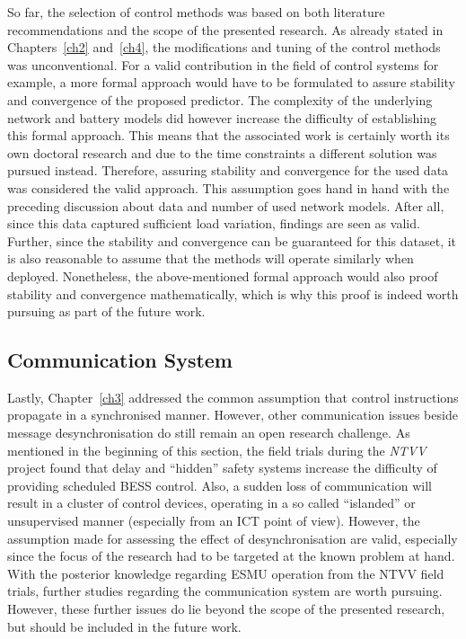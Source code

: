 So far, the selection of control methods was based on both literature recommendations and the scope of the presented research.
As already stated in Chapters~\ref{ch2} and~\ref{ch4}, the modifications and tuning of the control methods was unconventional.
For a valid contribution in the field of control systems for example, a more formal approach would have to be formulated to assure stability and convergence of the proposed predictor.
The complexity of the underlying network and battery models did however increase the difficulty of establishing this formal approach.
This means that the associated work is certainly worth its own doctoral research and due to the time constraints a different solution was pursued instead.
Therefore, assuring stability and convergence for the used data was considered the valid approach.
This assumption goes hand in hand with the preceding discussion about data and number of used network models.
After all, since this data captured sufficient load variation, findings are seen as valid.
Further, since the stability and convergence can be guaranteed for this dataset, it is also reasonable to assume that the methods will operate similarly when deployed.
Nonetheless, the above-mentioned formal approach would also proof stability and convergence mathematically, which is why this proof is indeed worth pursuing as part of the future work.

\subsection{Communication System}

Lastly, Chapter~\ref{ch3} addressed the common assumption that control instructions propagate in a synchronised manner.
However, other communication issues beside message desynchronisation do still remain an open research challenge.
As mentioned in the beginning of this section, the field trials during the \textit{NTVV} project found that delay and ``hidden'' safety systems increase the difficulty of providing scheduled BESS control.
Also, a sudden loss of communication will result in a cluster of control devices, operating in a so called ``islanded'' or unsupervised manner (especially from an ICT point of view).
However, the assumption made for assessing the effect of desynchronisation are valid, especially since the focus of the research had to be targeted at the known problem at hand.
With the posterior knowledge regarding ESMU operation from the NTVV field trials, further studies regarding the communication system are worth pursuing.
However, these further issues do lie beyond the scope of the presented research, but should be included in the future work.
